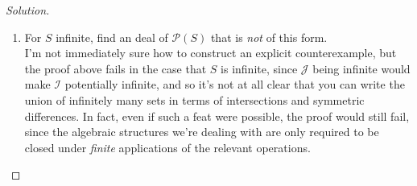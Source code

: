 \documentclass[12pt]{article}
\newenvironment{solution}
  {\renewcommand\qedsymbol{$\blacksquare$}\begin{proof}[Solution]}
{\end{proof}}
\theoremstyle{remark}
\begin{document}
\begin{solution}
\begin{enumerate}
      \item For $S$ infinite, find an deal of $\mathscr{P}(S)$ that is \textit{not} of this form.\\
      I'm not immediately sure how to construct an explicit counterexample, but the proof above fails
      in the case that $S$ is infinite, since $\mathcal{J}$ being infinite would make $\mathcal{I}$
      potentially infinite, and so it's not at all clear that you can write the union of infinitely
      many sets in terms of intersections and symmetric differences.
      In fact, even if such a feat were possible, the proof would still fail, since the
      algebraic structures we're dealing with are only required to be closed under \textit{finite} 
      applications of the relevant operations.
  \end{enumerate}



  
\end{solution}
\end{document}
